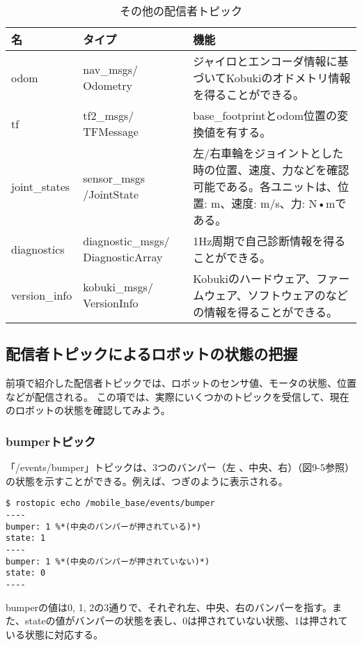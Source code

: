 \begin{itemize}
\begin{table}[htp]
\centering
\begin{tabular}{p{2cm} p{3cm} p{8cm}}
\toprule
\textbf{名} & \textbf{タイプ} & \textbf{機能}\\
\midrule
odom & nav\_msgs/ Odometry & ジャイロとエンコーダ情報に基づいてKobukiのオドメトリ情報を得ることができる。\\
tf & tf2\_msgs/ TFMessage & base\_footprintとodom位置の変換値を有する。\\
joint\_states & sensor\_msgs /JointState & 左/右車輪をジョイントとした時の位置、速度、力などを確認可能である。各ユニットは、位置: m、速度: m/s、力: N•mである。\\
diagnostics & diagnostic\_msgs/ DiagnosticArray & 1Hz周期で自己診断情報を得ることができる。\\
version\_info & kobuki\_msgs/ VersionInfo & Kobukiのハードウェア、ファームウェア、ソフトウェアのなどの情報を得ることができる。\\
\bottomrule
\end{tabular}
\caption{その他の配信者トピック}
\end{table}

\subsection{配信者トピックによるロボットの状態の把握}

前項で紹介した配信者トピックでは、ロボットのセンサ値、モータの状態、位置などが配信される。  この項では、実際にいくつかのトピックを受信して、現在のロボットの状態を確認してみよう。

\subsubsection{bumperトピック}

「/events/bumper」トピックは、3つのバンパー（左  、中央、右）（図9-5参照）の状態を示すことができる。例えば、つぎのように表示される。

\begin{lstlisting}[language=ROS]
$ rostopic echo /mobile_base/events/bumper
----
bumper: 1 %*(中央のバンパーが押されている)*)
state: 1
----
bumper: 1 %*(中央のバンパーが押されていない)*)
state: 0
----
\end{lstlisting}

bumperの値は0, 1, 2の3通りで、それぞれ左、中央、右のバンパーを指す。また、stateの値がバンパーの状態を表し、0は押されていない状態、1は押されている状態に対応する。


\end{itemize}

